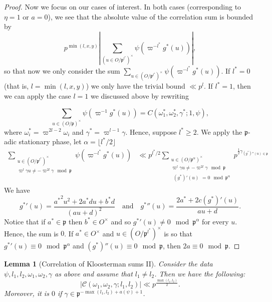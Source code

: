 \documentclass[a4paper,11pt]{amsart}
\newtheorem{lemma}[theorem]{Lemma}
\theoremstyle{definition}
\begin{document}
\begin{proof}
  Now we focus on our cases of interest. In both cases (corresponding to $\eta=1$ or $a=0$), we see that the absolute value of the correlation sum is bounded by 
 \[p^{\operatorname{min}(l,x,y)}\left\vert \sum_{(u\in O/\mathfrak{p}^{l^*})^\times}\psi(\varpi^{-l^*}g^*(u)) \right\vert,  \]
 so that now we only consider the sum $\sum_{u\in (O/\mathfrak{p}^{l^*})^\times}\psi(\varpi^{-l^*}g^*(u))$. If $l^* = 0$ (that is, $l=\min(l,x,y)$) we only have the trivial bound $\ll p^{l}$. If $l^* = 1$, then we can apply the case $l=1$ we discussed above by rewriting

 \[ \sum_{u\in (O/\mathfrak{p})^{\times}}
 \psi(\varpi^{-1}g^*(u)) = C(\omega_1^*,\omega_2^*,\gamma^*;1,\psi),\]
 where $\omega_i^* = \varpi^{2l-2}\omega_i$ and $\gamma^* = \varpi^{l-1}\gamma$.
 Hence, suppose $l^*\geq 2$. We apply the $\mathfrak{p}$-adic stationary phase, let $\alpha= \lfloor{l^*/2}\rfloor$ \begin{align*} \sum_{\substack{u\in (O/\mathfrak{p}^{l^*})^{\times}\\\varpi^{l}\gamma u\neq-\varpi^{2l}\gamma\mod\mathfrak{p}}}\psi\left(\varpi^{-l^*}g^*(u)\right) &\ll p^{l^*/2}\sum_{\substack{u\in (O/\mathfrak{p}^{\alpha})^{\times}\\\varpi^{l}\gamma u\neq -\varpi^{2l}\gamma \mod \mathfrak{p}\\\substack{(g^*)'(u)}=0 \mod \mathfrak{p}^{\alpha}}}p^{\frac{1}{2}\gamma_{(g^*)''(u)\in \mathfrak{p}}} \end{align*} We have $${g^*}'(u) = \frac{{a^*}^2u^2+2a^*du+b^*d}{(au+d)^2}\quad \text{and} \quad {g^*}''(u) = \frac{2a^*+2c(g^*)'(u)}{au+d}.$$ Notice that if $a^* \in \mathfrak{p}$ then $b^* \in O^{\times}$ and so ${g^*}'(u) \neq 0 \mod \mathfrak{p}^{\alpha}$ for every $u$. Hence, the sum is $0$. If $a^* \in O^{\times}$ and $u\in (O/\mathfrak{p}^{l^*})^{\times}$ is so that ${g^*}'(u)\equiv 0 \mod \mathfrak{p}^{\alpha}$ and $(g^*)''(u) \equiv 0 \mod \mathfrak{p}$, then $2a \equiv 0 \mod \mathfrak{p}$.
        \end{proof}

\begin{lemma}[Correlation of Kloosterman sums II]
     Consider the data $\psi,l_1,l_2,\omega_1,\omega_2,\gamma$ as above and assume that $l_1\neq l_2$. 
     Then we have the following:  \[    \vert{\mathcal{C}(\omega_1,\omega_2,\gamma;l_1,l_2)}\vert \ll p^{\frac{\max(l_1,l_2)}{2}}.\]
     Moreover, it is $0$ if $\gamma \in \mathfrak{p}^{-\max(l_1,l_2)+a(\psi)+1}$.
\end{lemma}
\end{document}
